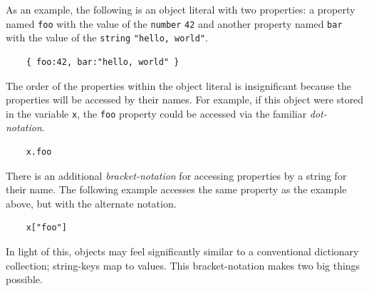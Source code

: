 \documentclass[11pt,letter]{book}
\begin{document}
    As an example, the following is an object literal with two properties: a property named 
    \texttt{foo} with the value of the \texttt{number} \texttt{42} and another property named 
    \texttt{bar} with the value of the \texttt{string} \texttt{"hello, world"}.
    
    \begin{verbatim}
    { foo:42, bar:"hello, world" }
    \end{verbatim}
    
    The order of the properties within the object literal is insignificant because the properties
    will be accessed by their names. For example, if this object were stored in the variable 
    \texttt{x}, the \texttt{foo} property could be accessed via the familiar \emph{dot-notation}.
    
    \begin{verbatim}
    x.foo
    \end{verbatim}
    
    There is an additional \emph{bracket-notation} for accessing properties by a string for their 
    name. The following example accesses the same property as the example above, but with the 
    alternate notation.
    
    \begin{verbatim}
    x["foo"]
    \end{verbatim}
    
    In light of this, objects may feel significantly similar to a conventional dictionary 
    collection; string-keys map to values. This bracket-notation makes two big things possible. 
    
\end{document}

